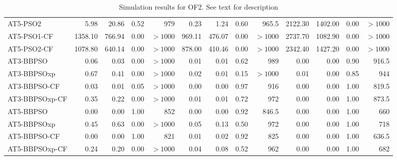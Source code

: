 \documentclass[cmbright]{staauth}
\begin{document}
\begin{table}[ht]
\begin{tabular}{l|rrrr|rrrr|rrrr}
  AT5-PSO2 & 5.98 & 20.86 & 0.52 & 979 & 0.23 & 1.24 & 0.60 & 965.5 & 2122.30 & 1402.00 & 0.00 & $> 1000$ \\
  AT5-PSO1-CF & 1358.10 & 766.94 & 0.00 & $> 1000$ & 969.11 & 476.07 & 0.00 & $> 1000$ & 2737.70 & 1082.90 & 0.00 & $> 1000$ \\
  AT5-PSO2-CF & 1078.80 & 640.14 & 0.00 & $> 1000$ & 878.00 & 410.46 & 0.00 & $> 1000$ & 2342.40 & 1427.20 & 0.00 & $> 1000$ \\
   \hline
AT3-BBPSO & 0.06 & 0.03 & 0.00 & $> 1000$ & 0.01 & 0.01 & 0.62 & 989 & 0.00 & 0.00 & 0.90 & 916.5 \\
  AT3-BBPSOxp & 0.67 & 0.41 & 0.00 & $> 1000$ & 0.02 & 0.01 & 0.15 & $> 1000$ & 0.01 & 0.00 & 0.85 & 944 \\
  AT3-BBPSO-CF & 0.03 & 0.01 & 0.05 & $> 1000$ & 0.00 & 0.00 & 0.97 & 916 & 0.00 & 0.00 & 1.00 & 819.5 \\
  AT3-BBPSOxp-CF & 0.35 & 0.22 & 0.00 & $> 1000$ & 0.01 & 0.01 & 0.72 & 972 & 0.00 & 0.00 & 1.00 & 873.5 \\
   \hline
AT5-BBPSO & 0.00 & 0.00 & 1.00 & 852 & 0.00 & 0.00 & 0.92 & 846.5 & 0.00 & 0.00 & 1.00 & 660 \\
  AT5-BBPSOxp & 0.45 & 0.63 & 0.00 & $> 1000$ & 0.05 & 0.13 & 0.50 & 972 & 0.00 & 0.00 & 1.00 & 718 \\
  AT5-BBPSO-CF & 0.00 & 0.00 & 1.00 & 821 & 0.01 & 0.02 & 0.92 & 825 & 0.00 & 0.00 & 1.00 & 636.5 \\
  AT5-BBPSOxp-CF & 0.24 & 0.20 & 0.00 & $> 1000$ & 0.04 & 0.08 & 0.52 & 962 & 0.00 & 0.00 & 1.00 & 682 \\
   \hline
\end{tabular}
\endgroup
\caption{Simulation results for OF2. See text for description}
\label{tab:psosim2}
\end{table}
\end{document}
